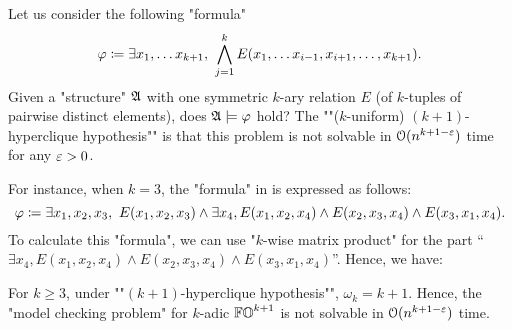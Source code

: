 \begin{hypothesis}\label{hypothesis: hyperclique hypothesis rephrased}
Let us consider the following "formula"
\[\fml \defeq \exists x_1, \dots x_{k+1},\ \bigwedge_{j = 1}^{k} E(x_1, \dots x_{i-1}, x_{i+1}, \dots, x_{k+1}).\]
Given a "structure" $\struc$ with one symmetric $k$-ary relation $E$ (of $k$-tuples of pairwise distinct elements),
does $\struc \models \fml$ hold?
The ""($k$-uniform) $(k+1)$-hyperclique hypothesis"" is that this problem is not solvable in $\mathcal{O}(n^{k+1 - \varepsilon})$ time for any $\varepsilon > 0$.\lipicsEnd
\end{hypothesis}
For instance, when $k = 3$, the "formula" in  is expressed as follows:
\[\fml \defeq \exists x_1, x_2, x_3,\  E(x_1, x_2, x_3) \land \exists x_4, E(x_1, x_2, x_4) \land E(x_2, x_3, x_4) \land E(x_3, x_1, x_4).\]
To calculate this "formula", we can use "$k$-wise matrix product" for the part ``$\exists x_4, E(x_1, x_2, x_4) \land E(x_2, x_3, x_4) \land E(x_3, x_1, x_4)$''.
Hence, we have:
\begin{proposition}
  For $k \ge 3$, under ""$(k+1)$-hyperclique hypothesis"", $\omega_k = k+1$.
  Hence, the "model checking problem" for $k$-adic $\mathbb{FO}^{k+1}$ is not solvable in $\mathcal{O}(n^{k + 1 - \varepsilon})$ time.
\end{proposition}

